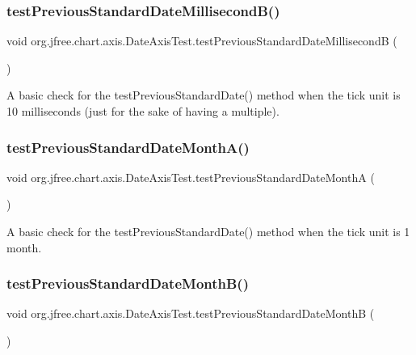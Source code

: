 \subsubsection{\texorpdfstring{test\+Previous\+Standard\+Date\+Millisecond\+B()}{testPreviousStandardDateMillisecondB()}}
{\footnotesize\ttfamily void org.\+jfree.\+chart.\+axis.\+Date\+Axis\+Test.\+test\+Previous\+Standard\+Date\+MillisecondB (\begin{DoxyParamCaption}{ }\end{DoxyParamCaption})}

A basic check for the test\+Previous\+Standard\+Date() method when the tick unit is 10 milliseconds (just for the sake of having a multiple). \mbox{\label{classorg_1_1jfree_1_1chart_1_1axis_1_1_date_axis_test_aba9835ab269201f2e1b77cbef85ff3d3}} 
\subsubsection{\texorpdfstring{test\+Previous\+Standard\+Date\+Month\+A()}{testPreviousStandardDateMonthA()}}
{\footnotesize\ttfamily void org.\+jfree.\+chart.\+axis.\+Date\+Axis\+Test.\+test\+Previous\+Standard\+Date\+MonthA (\begin{DoxyParamCaption}{ }\end{DoxyParamCaption})}

A basic check for the test\+Previous\+Standard\+Date() method when the tick unit is 1 month. \mbox{\label{classorg_1_1jfree_1_1chart_1_1axis_1_1_date_axis_test_a6ebe1b079f47acb7719837b8a66b92c4}} 
\subsubsection{\texorpdfstring{test\+Previous\+Standard\+Date\+Month\+B()}{testPreviousStandardDateMonthB()}}
{\footnotesize\ttfamily void org.\+jfree.\+chart.\+axis.\+Date\+Axis\+Test.\+test\+Previous\+Standard\+Date\+MonthB (\begin{DoxyParamCaption}{ }\end{DoxyParamCaption})}

